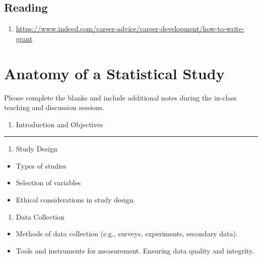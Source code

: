 \documentclass[
  letterpaper,
  DIV=11,
  numbers=noendperiod]{scrreprt}
\providecommand{\tightlist}{%
  \setlength{\itemsep}{0pt}\setlength{\parskip}{0pt}}\usepackage{longtable,booktabs,array}
\begin{document}
\section{Reading}\label{reading}

\begin{enumerate}
\def\labelenumi{\arabic{enumi}.}
\tightlist
\item
  \url{https://www.indeed.com/career-advice/career-development/how-to-write-grant}
\end{enumerate}


\chapter{Anatomy of a Statistical
Study}\label{anatomy-of-a-statistical-study}

Please complete the blanks and include additional notes during the
in-class teaching and discussion sessions.

\begin{enumerate}
\def\labelenumi{\arabic{enumi}.}
\tightlist
\item
  Introduction and Objectives
\end{enumerate}

\begin{center}\rule{0.5\linewidth}{0.5pt}\end{center}

\begin{enumerate}
\def\labelenumi{\arabic{enumi}.}
\setcounter{enumi}{1}
\tightlist
\item
  Study Design
\end{enumerate}

\begin{itemize}
\item
  Types of studies
\item
  Selection of variables
\item
  Ethical considerations in study design.
\end{itemize}

\begin{enumerate}
\def\labelenumi{\arabic{enumi}.}
\setcounter{enumi}{2}
\tightlist
\item
  Data Collection
\end{enumerate}

\begin{itemize}
\item
  Methods of data collection (e.g., surveys, experiments, secondary
  data).
\item
  Tools and instruments for measurement. Ensuring data quality and
  integrity.
\end{itemize}
\end{document}
